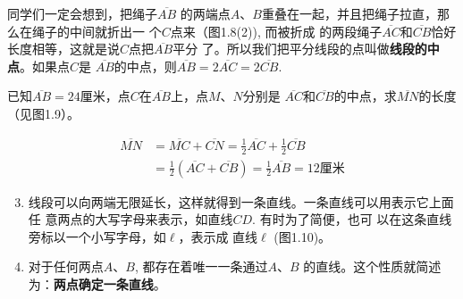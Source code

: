 同学们一定会想到，把绳子$\overline{AB}$
的两端点$A$、$B$重叠在一起，并且把绳子拉直，那么在绳子的中间就折出一
个$C$点来（图1.8(2)), 而被折成
的两段绳子$\overline{AC}$和$\overline{CB}$恰好长度相等，这就是说$C$点把$\overline{AB}$平分
了。所以我们把平分线段的点叫做\textbf{线段的中点}。如果点$C$是
$\overline{AB}$的中点，则$\overline{AB}=2\overline{AC}=2\overline{CB}$.

\begin{figure}[htp]\centering
    \begin{minipage}[t]{0.48\textwidth}
    \centering
{}
    \caption{}
    \end{minipage}
    \begin{minipage}[t]{0.48\textwidth}
    \centering
    \caption{}
    \end{minipage}
    \end{figure}



\begin{example}
	已知$\overline{AB}=24$厘米，点$C$在$\overline{AB}$上，点$M$、$N$分别是
	$\overline{AC}$和$\overline{CB}$的中点，求$\overline{MN}$的长度（见图1.9）。
\end{example}

\begin{solution}
\[\begin{split}
	\overline{MN}&=\overline{MC}+\overline{CN}=\frac{1}{2}\overline{AC}+\frac{1}{2}\overline{CB}\\
	&=\frac{1}{2}\left(\overline{AC}+\overline{CB}\right)=\frac{1}{2}\overline{AB}=12\text{厘米}
\end{split}\]
\end{solution}

\begin{enumerate}\setcounter{enumi}{2} 
	\item 线段可以向两端无限延长，这样就得到一条直线。一条直线可以用表示它上面任
	意两点的大写字母来表示，如直线$CD$. 有时为了简便，也可
	以在这条直线旁标以一个小写字母，如$\ell$，表示成
	直线$\ell $ (图1.10)。
	\item 对于任何两点$A$、$B$, 都存在着唯一一条通过$A$、$B$
	的直线。这个性质就简述为：\textbf{两点确定一条直线}。
\end{enumerate}


